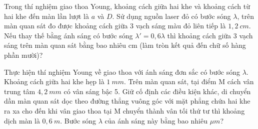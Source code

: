 \begin{ex}
Trong thí nghiệm giao thoa Young, khoảng cách giữa hai khe và khoảng cách từ hai khe đến màn lần lượt là $a$ và $D$. Sử dụng nguồn laser đỏ có bước sóng $\lambda$, trên màn quan sát đo được khoảng cách giữa 3 vạch sáng màu đỏ liên tiếp là $1,2\ cm$. Nếu thay thế bằng ánh sáng có bước sóng $\lambda' = 0,6\lambda$ thì khoảng cách giữa 3 vạch sáng trên màn quan sát bằng bao nhiêu cm (làm tròn kết quả đến chữ số hàng phần mười)?
\loigiai{}
\end{ex}
\begin{ex}
Thực hiện thí nghiệm Young về giao thoa với ánh sáng đơn sắc có bước sóng $\lambda$. Khoảng cách giữa hai khe hẹp là $1 \  mm$. Trên màn quan sát, tại điểm M cách vân trung tâm $4,2\  mm$ có vân sáng bậc 5. Giữ cố định các điều kiện khác, di chuyển dần màn quan sát dọc theo đường thẳng vuông góc với mặt phẳng chứa hai khe ra xa cho đến khi vân giao thoa tại M chuyển thành vân tối thứ tư thì khoảng dịch màn là $0,6 \   m$. Bước sóng $\lambda$ của ánh sáng này bằng bao nhiêu $\mu m$?
\end{ex}

